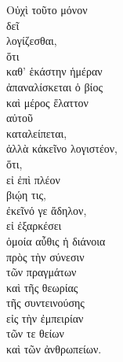{\large
\begin{greek}
\noindent Οὐχὶ τοῦτο μόνον \\
\tabto{2em} δεῖ \\
\tabto{4em} λογίζεσθαι, \\
\tabto{6em} ὅτι \\
\tabto{8em} καθ' ἑκάστην ἡμέραν \\
\tabto{6em} ἀπαναλίσκεται ὁ βίος \\
\tabto{6em} καὶ μέρος ἔλαττον \\
\tabto{8em} αὐτοῦ \\
\tabto{6em} καταλείπεται, \\
ἀλλὰ κἀκεῖνο λογιστέον, \\
\tabto{2em} ὅτι, \\
\tabto{4em} εἰ ἐπὶ πλέον \\
\tabto{6em} βιῴη τις, \\
\tabto{8em} ἐκεῖνό γε ἄδηλον, \\
\tabto{10em} εἰ ἐξαρκέσει \\
\tabto{10em} ὁμοία αὖθις ἡ διάνοια \\
\tabto{12em} πρὸς τὴν σύνεσιν \\
\tabto{14em} τῶν πραγμάτων \\
\tabto{12em} καὶ τῆς θεωρίας \\
\tabto{12em} τῆς συντεινούσης \\
\tabto{14em} εἰς τὴν ἐμπειρίαν \\
\tabto{16em} τῶν τε θείων \\
\tabto{16em} καὶ τῶν ἀνθρωπείων.\\

\end{greek}
}

